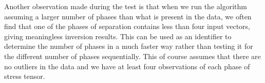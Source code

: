 Another observation made during the test is that when we run the algorithm assuming a larger number of phases than what is present in the data, we often find that one of the phases of separation contains less than four input vectors, giving meaningless inversion results. This can be used as an identifier to determine the number of phases in a much faster way rather than testing it for the different number of phases sequentially. This of course assumes that there are no outliers in the data and we have at least four observations of each phase of stress tensor.
